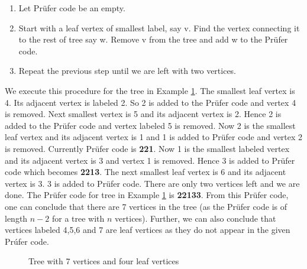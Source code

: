 \begin{enumerate}
\item Let Pr{\"u}fer code be an empty.

\item Start with a leaf vertex of smallest label, say v. Find the vertex connecting it to the rest of tree say w.  Remove v from the tree and add w to the Pr{\"u}fer code.
 
\item Repeat the previous step until we are left with two vertices.
\end{enumerate}

We execute this procedure for the tree in Example \ref{8g5}. The smallest leaf vertex is 4. Its adjacent vertex is labeled 2. So 2 is added to the Pr{\"u}fer code and vertex 4 is removed. Next smallest vertex is 5 and its adjacent vertex is 2. Hence 2 is added to the Pr{\"u}fer code and vertex labeled 5 is removed. Now 2 is the smallest leaf vertex and its adjacent vertex is 1 and  1 is added to Pr{\"u}fer code and vertex 2 is removed. Currently Pr{\"u}fer code is \textbf{221}. Now 1 is the smallest labeled vertex and its adjacent vertex is 3 and vertex 1 is removed. Hence 3 is added to Pr{\"u}fer code which becomes \textbf{2213}. The next smallest leaf vertex is 6 and its adjacent vertex is 3. 3 is added to Pr{\"u}fer code. There are only two vertices left and we are done. The Pr{\"u}fer code for tree in Example \ref{8g5} is \textbf{22133}. From this Pr{\"u}fer code, one can conclude that there are 7 vertices in the tree (as the Pr{\"u}fer code is of length $n-2$ for a tree with $n$ vertices). Further, we can also conclude that vertices labeled 4,5,6 and 7 are leaf vertices as they do not appear in the given Pr{\'u}fer code. 
\begin{figure}
\begin{center}


\caption{Tree with 7 vertices and four leaf vertices }\label{8g5}
\end{center}
\end{figure}

